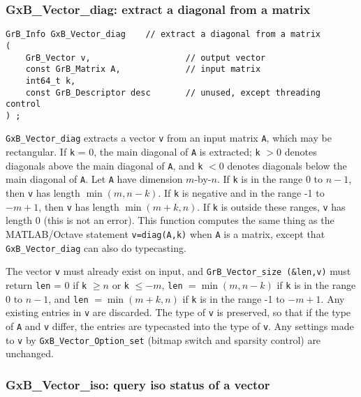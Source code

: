 \documentclass[12pt]{article}
\begin{document}
\newpage
\subsubsection{{\sf GxB\_Vector\_diag:} extract a diagonal from a matrix}
\label{vector_diag}

\begin{mdframed}[userdefinedwidth=6in]
{\footnotesize
\begin{verbatim}
GrB_Info GxB_Vector_diag    // extract a diagonal from a matrix
(
    GrB_Vector v,                   // output vector
    const GrB_Matrix A,             // input matrix
    int64_t k,
    const GrB_Descriptor desc       // unused, except threading control
) ;
\end{verbatim} } \end{mdframed}


\verb'GxB_Vector_diag' extracts a vector \verb'v' from an input matrix
\verb'A', which may be rectangular.  If \verb'k' = 0, the main diagonal of
\verb'A' is extracted; \verb'k' $> 0$ denotes diagonals above the main diagonal
of \verb'A', and \verb'k' $< 0$ denotes diagonals below the main diagonal of
\verb'A'.  Let \verb'A' have dimension $m$-by-$n$.  If \verb'k' is in the range
0 to $n-1$, then \verb'v' has length $\min(m,n-k)$.  If \verb'k' is negative
and in the range -1 to $-m+1$, then \verb'v' has length $\min(m+k,n)$.  If
\verb'k' is outside these ranges, \verb'v' has length 0 (this is not an error).
This function computes the same thing as the MATLAB/Octave statement
\verb'v=diag(A,k)' when \verb'A' is a matrix, except that
\verb'GxB_Vector_diag' can also do typecasting.

The vector \verb'v' must already exist on input, and
\verb'GrB_Vector_size (&len,v)' must return \verb'len' = 0 if \verb'k' $\ge n$
or \verb'k' $\le -m$, \verb'len' $=\min(m,n-k)$ if \verb'k' is in the range 0
to $n-1$, and \verb'len' $=\min(m+k,n)$ if \verb'k' is in the range -1 to
$-m+1$.  Any existing entries in \verb'v' are discarded.  The type of \verb'v'
is preserved, so that if the type of \verb'A' and \verb'v' differ, the entries
are typecasted into the type of \verb'v'.  Any settings made to \verb'v' by
\verb'GxB_Vector_Option_set' (bitmap switch and sparsity control) are
unchanged.

\subsubsection{{\sf GxB\_Vector\_iso:} query iso status of a vector}
\label{vector_iso}
\end{document}
